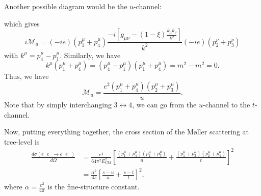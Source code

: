 \documentclass[11pt]{article}
\theoremstyle{definition}
\begin{document}
Another possible diagram would be the $u$-channel:
\begin{center}
\end{center}
which gives
\begin{equation}
    i\mathcal{M}_u = (-ie)(p_1^\mu + p_4^\mu)\frac{-i\left[ g_{\mu\nu} - (1-\xi)\frac{k_\mu k_\nu}{k^2}\right]}{k^2}(-ie)(p_2^\nu + p_3^\nu)
\end{equation}
with $k^\mu = p_4^\mu - p_1^\mu$. Similarly, we have
\begin{equation}
    k^\mu(p_1^\mu + p_4^\mu) = (p_4^\mu - p_1^\mu)(p_1^\mu + p_4^\mu) = m^2 - m^2 = 0.
\end{equation}
Thus, we have
\begin{equation}
    \mathcal{M}_u =\frac{e^2(p_1^\mu + p_4^\mu)(p_2^\mu + p_3^\mu)}{u}.
\end{equation}
Note that by simply interchanging $3 \leftrightarrow 4$, we can go from the $u$-channel to the $t$-channel.

Now, putting everything together, the cross section of the Møller scattering at tree-level is
\begin{equation}
\begin{aligned}
        \frac{d\sigma(e^-e^- \rightarrow e^-e^-)}{d\Omega} &= \frac{e^4}{64\pi^2E_\text{CM}^2}\left[\frac{(p_1^\mu + p_4^\mu)(p_2^\mu + p_3^\mu)}{u} +  \frac{(p_1^\mu + p_3^\mu)(p_2^\mu + p_4^\mu)}{t}\right]^2\\
        &= \frac{\alpha^2}{4s}\left[\frac{s-u}{u} +  \frac{s-t}{t}\right]^2,
\end{aligned}
\end{equation}
where $\alpha= \frac{e^2}{4\pi}$ is the fine-structure constant.
\end{document}
